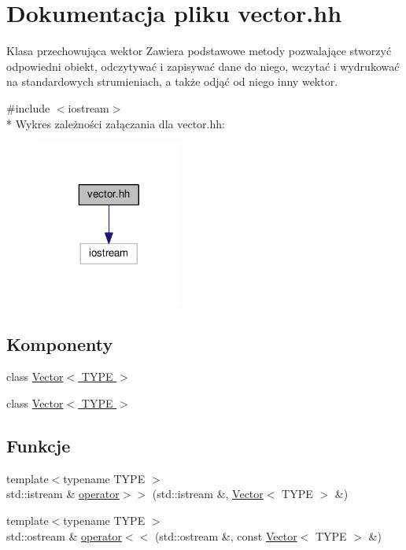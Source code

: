 \hypertarget{vector_8hh}{\section{Dokumentacja pliku vector.\-hh}
\label{vector_8hh}
}


Klasa przechowująca wektor Zawiera podstawowe metody pozwalające stworzyć odpowiedni obiekt, odczytywać i zapisywać dane do niego, wczytać i wydrukować na standardowych strumieniach, a także odjąć od niego inny wektor.  


{\ttfamily \#include $<$iostream$>$}\\*
Wykres zależności załączania dla vector.\-hh\-:
\nopagebreak
\begin{figure}[H]
\begin{center}
\leavevmode
\includegraphics[width=136pt]{vector_8hh__incl}
\end{center}
\end{figure}
\subsection*{Komponenty}
\begin{DoxyCompactItemize}
\item 
class \hyperlink{class_vector}{Vector$<$ T\-Y\-P\-E $>$}
\item 
class \hyperlink{class_vector}{Vector$<$ T\-Y\-P\-E $>$}
\end{DoxyCompactItemize}
\subsection*{Funkcje}
\begin{DoxyCompactItemize}
\item 
{\footnotesize template$<$typename T\-Y\-P\-E $>$ }\\std\-::istream \& \hyperlink{vector_8hh_af9f1d76a42b7800e17a6da47fce9e179}{operator$>$$>$} (std\-::istream \&, \hyperlink{class_vector}{Vector}$<$ T\-Y\-P\-E $>$ \&)
\item 
{\footnotesize template$<$typename T\-Y\-P\-E $>$ }\\std\-::ostream \& \hyperlink{vector_8hh_aebb7c04457be6d2378fa43ce22cfb408}{operator$<$$<$} (std\-::ostream \&, const \hyperlink{class_vector}{Vector}$<$ T\-Y\-P\-E $>$ \&)
\end{DoxyCompactItemize}


